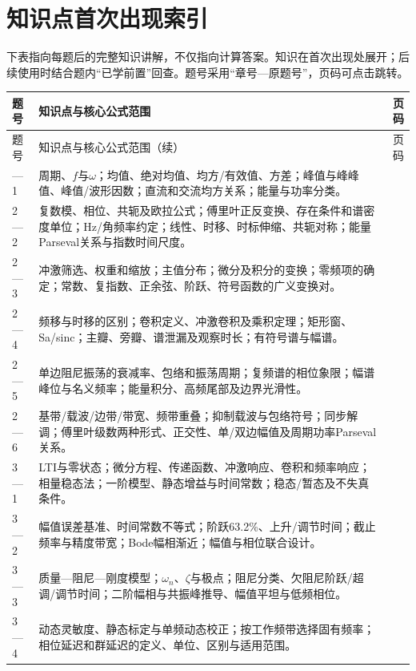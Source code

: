 \chapter*{知识点首次出现索引}
\label{hw:knowledge-index}
\noindent 下表指向每题后的完整知识讲解，不仅指向计算答案。知识在首次出现处展开；后续使用时结合题内“已学前置”回查。题号采用“章号—原题号”，页码可点击跳转。

\begingroup
{}
\small
\setlength{\tabcolsep}{5pt}
\begin{longtable}{@{}p{1.05cm}p{12.25cm}r@{}}
\toprule
题号 & 知识点与核心公式范围 & 页码\\
\midrule
\endfirsthead
\toprule
题号 & 知识点与核心公式范围（续） & 页码\\
\midrule
\endhead
\bottomrule
\endfoot
2—1 & 周期、$f$与$\omega$；均值、绝对均值、均方/有效值、方差；峰值与峰峰值、峰值/波形因数；直流和交流均方关系；能量与功率分类。 & \pageref{kn:2-1}\\
2—2 & 复数模、相位、共轭及欧拉公式；傅里叶正反变换、存在条件和谱密度单位；Hz/角频率约定；线性、时移、时标伸缩、共轭对称；能量Parseval关系与指数时间尺度。 & \pageref{kn:2-2}\\
2—3 & 冲激筛选、权重和缩放；主值分布；微分及积分的变换；零频项的确定；常数、复指数、正余弦、阶跃、符号函数的广义变换对。 & \pageref{kn:2-3}\\
2—4 & 频移与时移的区别；卷积定义、冲激卷积及乘积定理；矩形窗、Sa/sinc；主瓣、旁瓣、谱泄漏及观察时长；有符号谱与幅谱。 & \pageref{kn:2-4}\\
2—5 & 单边阻尼振荡的衰减率、包络和振荡周期；复频谱的相位象限；幅谱峰位与名义频率；能量积分、高频尾部及边界光滑性。 & \pageref{kn:2-5}\\
2—6 & 基带/载波/边带/带宽、频带重叠；抑制载波与包络符号；同步解调；傅里叶级数两种形式、正交性、单/双边幅值及周期功率Parseval关系。 & \pageref{kn:2-6}\\
3—1 & LTI与零状态；微分方程、传递函数、冲激响应、卷积和频率响应；相量稳态法；一阶模型、静态增益与时间常数；稳态/暂态及不失真条件。 & \pageref{kn:3-1}\\
3—2 & 幅值误差基准、时间常数不等式；阶跃63.2\%、上升/调节时间；截止频率与精度带宽；Bode幅相渐近；幅值与相位联合设计。 & \pageref{kn:3-2}\\
3—3 & 质量—阻尼—刚度模型；$\omega_n$、$\zeta$与极点；阻尼分类、欠阻尼阶跃/超调/调节时间；二阶幅相与共振峰推导、幅值平坦与低频相位。 & \pageref{kn:3-3}\\
3—4 & 动态灵敏度、静态标定与单频动态校正；按工作频带选择固有频率；相位延迟和群延迟的定义、单位、区别与适用范围。 & \pageref{kn:3-4}\\

\end{longtable}
